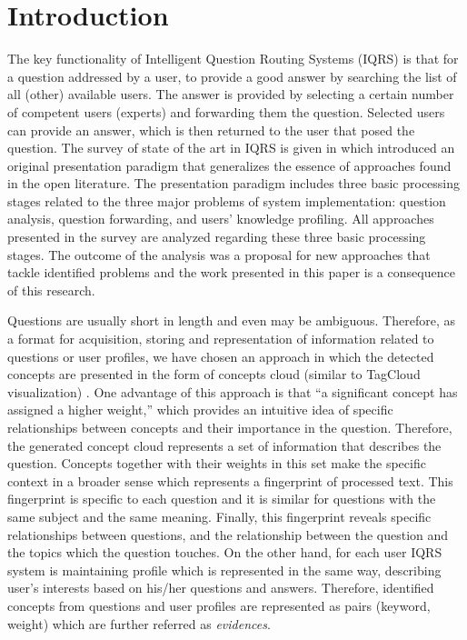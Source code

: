 \documentclass[conference]{IEEEtran}
\begin{document}
%
\IEEEpeerreviewmaketitle



\section{Introduction}
The key functionality of Intelligent Question Routing Systems (IQRS) is that for a question addressed by a user, to provide a good answer by searching the list of all (other) available users. The answer is provided by selecting a certain number of competent users (experts) and forwarding them the question. Selected users can provide an answer, which is then returned to the user that posed the question. The survey of state of the art in IQRS is given in \cite{bib:survey2013} which introduced an original presentation paradigm that generalizes the essence of approaches found in the open literature. The presentation paradigm includes three basic processing stages related to the three major problems of system implementation: question analysis, question forwarding, and users' knowledge profiling. All approaches presented in the survey are analyzed regarding these three basic processing stages. The outcome of the analysis was a proposal for new approaches that tackle identified problems and the work presented in this paper is a consequence of this research.

Questions are usually short in length and even may be ambiguous. Therefore, as a format for acquisition, storing and representation of information related to questions or user profiles, we have chosen an approach in which the detected concepts are presented in the form of concepts cloud (similar to TagCloud visualization) \cite{bib:TAG07, bib:TAG08}. One advantage of this approach is that ``a significant concept has assigned a higher weight,'' which provides an intuitive idea of specific relationships between concepts and their importance in the question. Therefore, the generated concept cloud represents a set of information that describes the question. Concepts together with their weights in this set make the specific context in a broader sense which represents a fingerprint of processed text. This fingerprint is specific to each question and it is similar for questions with the same subject and the same meaning. Finally, this fingerprint reveals specific relationships between questions, and the relationship between the question and the topics which the question touches. On the other hand, for each user IQRS system is maintaining profile which is represented in the same way, describing user’s interests based on his/her questions and answers. Therefore, identified concepts from questions and user profiles are represented as pairs (keyword, weight) which are further referred as {\it evidences}.
\end{document}
